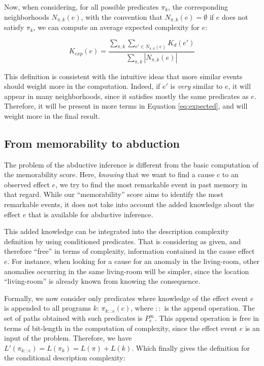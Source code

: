 \documentclass[conference]{IEEEtran}
\begin{document}
Now, when considering, for all possible predicates $\pi_k$, the corresponding
neighborhoods $N_{\pi, k}(e)$, with the convention that $N_{\pi, k}(e) = \emptyset$
if $e$ does not satisfy $\pi_k$, we can compute an average expected complexity for $e$:

\begin{equation}
  \label{eq:expected}
  K_{exp}(e) = \frac{
  \sum_{\pi, k} \sum_{e' \in N_{\pi, k}(e)} K_d(e')
  }{
  \sum_{\pi, k} |N_{\pi, k}(e)|
  }
\end{equation}

This definition is consistent with the intuitive ideas that more similar events should weight more in the computation. Indeed, if $e'$
is \emph{very} similar to $e$, it will appear in many neighborhoods, since it
satisfies mostly the same predicates as $e$. Therefore, it will
be present in more terms in Equation \ref{eq:expected}, and will weight more in
the final result.

\subsection{From memorability to abduction}
The problem of the abductive inference is different from the basic computation
of the memorability score. Here, \emph{knowing} that we want to find a cause $c$
to an observed effect $e$, we try to find the most remarkable event in past
memory in that regard. While our ``memorability'' score aims to identify the
most remarkable events, it does not take into account the added knowledge about
the effect $e$ that is available for abductive inference.

This added knowledge can be integrated into the description complexity definition by using conditioned predicates. That is considering as given, and therefore ``free'' in terms of complexity, information contained in the cause effect $e$. For instance, when looking for a cause for
an anomaly in the living-room, other anomalies occurring in the same
living-room will be simpler, since the location ``living-room'' is already known
from knowing the consequence.

Formally, we now consider only predicates where knowledge of the effect event $e$  is appended to all programs $k$:
$\pi_{k::e}(c)$, where $::$ is the append operation. The set of paths obtained with such predicates is $P^\infty_e$. This append operation is free in terms of bit-length in the computation of complexity, since the effect event $e$ is an input of the problem. Therefore, we have $L'(\pi_{k::e}) = L(\pi_k) = L(\pi) + L(k)$. Which finally gives the definition for the conditional description complexity:
\end{document}
